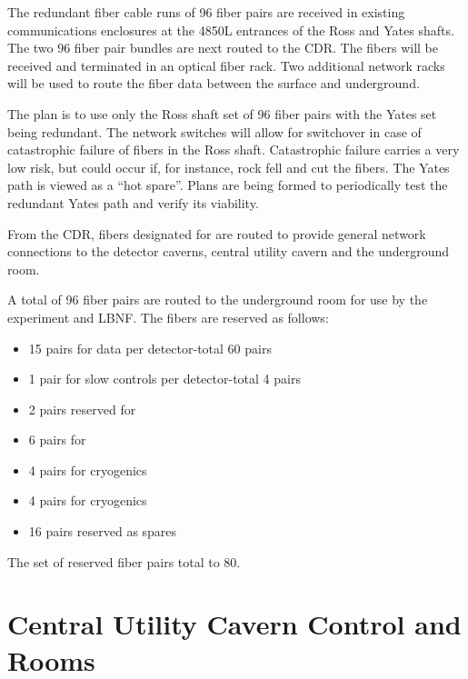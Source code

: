 The redundant fiber cable runs of 96 fiber pairs are received in
existing communications enclosures at the 4850L entrances of the Ross
and Yates shafts.  The two 96 fiber pair bundles are next routed to
the CDR.  The fibers will be received and terminated in an optical
fiber rack. Two additional network racks will be used to route the
fiber data between the surface and underground.

The plan is to use only the Ross shaft set of 96 fiber pairs with the
Yates set being redundant.  The network switches will allow for
switchover in case of catastrophic failure of fibers in the Ross
shaft. Catastrophic failure carries a very low risk, but could occur
if, for instance, rock fell and cut the fibers.  The Yates path is
viewed as a ``hot spare''. Plans are being formed to periodically test
the redundant Yates path and verify its viability.

From the CDR, fibers designated for  are routed to provide
general network connections to the detector caverns, central utility
cavern and the underground  room.

A total of 96 fiber pairs are routed to the underground  room for
use by the  experiment and LBNF. The fibers are reserved as
follows:
\begin{itemize}
  \item 15 pairs for  data per detector-total 60 pairs
\item 1 pair for slow controls per detector-total 4 pairs
\item 2 pairs reserved for 
\item 6 pairs for 
\item 4 pairs for  cryogenics
\item 4 pairs for  cryogenics
  \item 16 pairs reserved as spares
\end{itemize}
The set of reserved fiber pairs total to 80.



\section{Central Utility Cavern Control and  Rooms}
\label{sec:fdsp-coord-cuc-daq}

